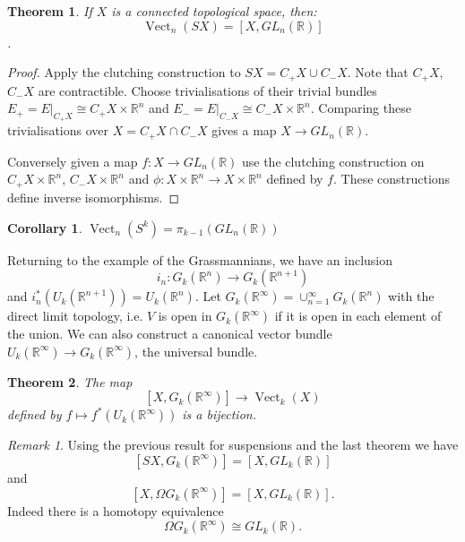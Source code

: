 \documentclass[a4paper,10pt]{article}
\theoremstyle{plain}%
\newtheorem{thm}{Theorem}
\newtheorem{cor}{Corollary}
\theoremstyle{definition}
\theoremstyle{remark}
\newtheorem{rem}{Remark}
\newcommand{\RR}{\mathbb{R}}
\DeclareMathOperator{\Vect}{Vect}
\begin{document}
\begin{thm}
If $X$ is a connected topological space, then: 
$$\Vect_n(SX) = [X, GL_n(\RR)]$$.
\end{thm}

\begin{proof} Apply the clutching construction to $SX = C_+X\cup C_- X$. Note that $C_+ X$, $C_-X$ are contractible. Choose trivialisations of their trivial bundles $E_+ = E |_{C_+X}\cong C_+X\times \RR^n$ and $E_- = E |_{C_-X}\cong C_-X\times \RR^n.$ Comparing these trivialisations over $X = C_+X\cap C_- X$ gives a map $X\to GL_n(\RR).$

Conversely given a map $f:X\to GL_n(\RR)$ use the clutching construction on $C_+X\times \RR^n$, $C_-X\times \RR^n$ and $\phi:X\times \RR^n\to X\times\RR^n$ defined by $f$. These constructions define inverse isomorphisms.\end{proof}

\begin{cor}
$\Vect_n(S^ k) =  \pi_{k-1}(GL_n(\RR))$
\end{cor}

Returning to the example of the Grassmannians, we have an inclusion
\[ 
i_n:G_k(\RR^n)\to G_k(\RR^{n+1})
\]
and $i_n^*(U_k(\RR^{n+1}))= U_k(\RR^n).$ Let $G_k(\RR^\infty) = \cup_{n=1}^\infty G_k(\RR^n)$ with the direct limit topology, i.e. $V$ is open in $G_k(\RR^\infty)$ if it is open in each element of the union. We can also construct a canonical vector bundle $U_k(\RR^\infty)\to G_k(\RR^\infty)$, the universal bundle.

\begin{thm}
The map
\[
[X,G_k(\RR^\infty)]\to \Vect_k(X)
\] defined by $f\mapsto f^*(U_k(\RR^\infty))$ is a bijection.
\end{thm}

\begin{rem}
Using the previous result for suspensions and the last theorem we have
\[
[SX, G_k(\RR^\infty)] = [X, GL_k(\RR)]
\]
and
\[
[X, \Omega G_k(\RR^\infty)] = [X, GL_k(\RR)].
\]
Indeed there is a homotopy equivalence
\[
\Omega G_k(\RR^\infty) \cong GL_k(\RR).
\]
\end{rem}
\end{document}
